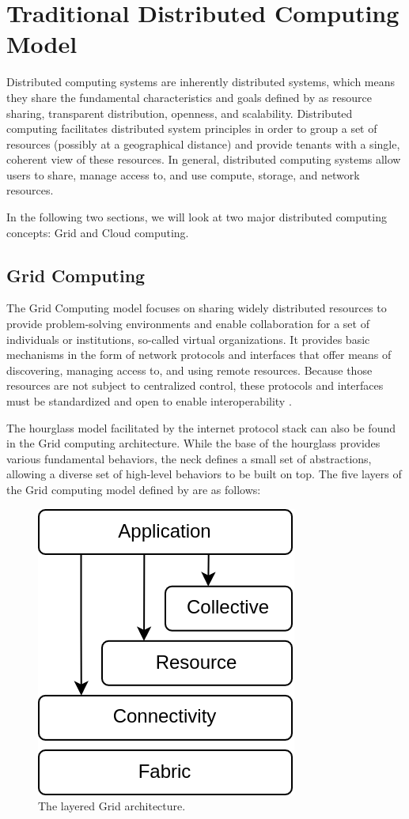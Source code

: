 \section{Traditional Distributed Computing Model}
\label{sec:traditional-distributed-computing}

Distributed computing systems are inherently distributed systems, which means
they share the fundamental characteristics and goals defined by
\citeauthor{tannenbaum2017} \cite{tannenbaum2017} as resource sharing,
transparent distribution, openness, and scalability. Distributed computing
facilitates distributed system principles in order to group a set of resources
(possibly at a geographical distance) and provide tenants with a single,
coherent view of these resources. In general, distributed computing systems
allow users to share, manage access to, and use compute, storage, and network
resources.

In the following two sections, we will look at two major distributed computing
concepts: Grid and Cloud computing.

\subsection{Grid Computing}

The Grid Computing model focuses on sharing widely distributed resources to
provide problem-solving environments and enable collaboration for a set of
individuals or institutions, so-called virtual organizations. It provides basic
mechanisms in the form of network protocols and interfaces that offer means of
discovering, managing access to, and using remote resources. Because those
resources are not subject to centralized control, these protocols and interfaces
must be standardized and open to enable interoperability \cite{foster2001grid}.

The hourglass model facilitated by the internet protocol stack can also be found
in the Grid computing architecture. While the base of the hourglass provides
various fundamental behaviors, the neck defines a small set of abstractions,
allowing a diverse set of high-level behaviors to be built on top. The five
layers of the Grid computing model defined by \citeauthor{foster2001grid}
\cite{foster2001grid} are as follows:

\begin{figure}[H]
  \centering
  \includegraphics[width=0.25\linewidth]{resources/grid-architecture.drawio.png}
  \caption{The layered Grid architecture.}
  \label{fig:grid-architecture}
\end{figure}


